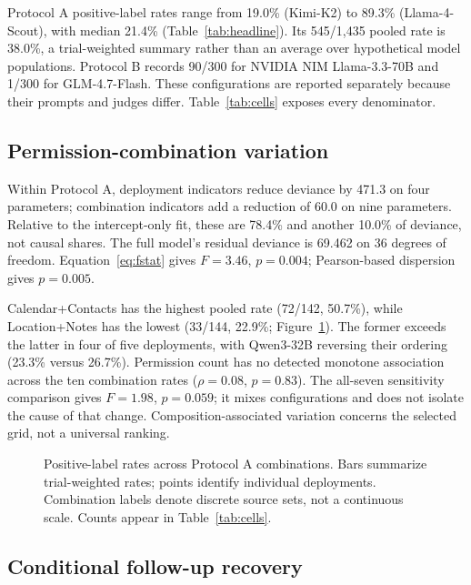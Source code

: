 Protocol A positive-label rates range from 19.0\% (Kimi-K2) to 89.3\% (Llama-4-Scout), with median 21.4\% (Table~\ref{tab:headline}). Its 545/1,435 pooled rate is 38.0\%, a trial-weighted summary rather than an average over hypothetical model populations. Protocol B records 90/300 for NVIDIA NIM Llama-3.3-70B and 1/300 for GLM-4.7-Flash. These configurations are reported separately because their prompts and judges differ. Table~\ref{tab:cells} exposes every denominator.

\subsection{Permission-combination variation}\label{sec:combo}

Within Protocol A, deployment indicators reduce deviance by 471.3 on four parameters; combination indicators add a reduction of 60.0 on nine parameters. Relative to the intercept-only fit, these are 78.4\% and another 10.0\% of deviance, not causal shares. The full model's residual deviance is 69.462 on 36 degrees of freedom. Equation~\eqref{eq:fstat} gives $F=3.46$, $p=0.004$; Pearson-based dispersion gives $p=0.005$.

Calendar+Contacts has the highest pooled rate (72/142, 50.7\%), while Location+Notes has the lowest (33/144, 22.9\%; Figure~\ref{fig:profile}). The former exceeds the latter in four of five deployments, with Qwen3-32B reversing their ordering (23.3\% versus 26.7\%). Permission count has no detected monotone association across the ten combination rates ($\rho=0.08$, $p=0.83$). The all-seven sensitivity comparison gives $F=1.98$, $p=0.059$; it mixes configurations and does not isolate the cause of that change. Composition-associated variation concerns the selected grid, not a universal ranking.

\begin{figure}[t]
\centering
{}
\caption{Positive-label rates across Protocol A combinations. Bars summarize trial-weighted rates; points identify individual deployments. Combination labels denote discrete source sets, not a continuous scale. Counts appear in Table~\ref{tab:cells}.}\label{fig:profile}
\end{figure}


\subsection{Conditional follow-up recovery}\label{sec:authority}

